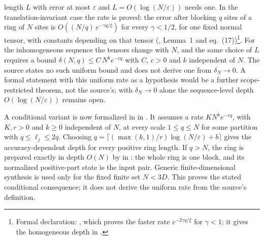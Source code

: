 \documentclass{article}
\begin{document}
\begin{enumerate}
          length $L$ with error at most $\varepsilon$ and $L=O(\log(N/\varepsilon))$
          needs one. In the translation-invariant case the rate is proved: the
          error after blocking $q$ sites of a ring of $N$ sites is
          $O((N/q)\,e^{-\gamma q/\xi})$ for every $\gamma<1/2$, for one fixed
          normal tensor, with constants depending on that tensor (\cite{Malz2024Preparation}, Lemma~1 and
          eq.~(17))\footnote{Formal declaration:
              , which proves
              the faster rate $e^{-2\gamma q/\xi}$ for $\gamma<1$; it gives the
              homogeneous depth in
              .}.
          For the inhomogeneous sequence the tensors change with $N$, and the
          same choice of $L$ requires a bound
          $\delta(N,q)\le C\,N^{k}e^{-cq}$ with $C$, $c>0$ and $k$ independent of
          $N$. The source states no such uniform bound and does not derive one
          from $\delta_N\to0$. A formal statement with this uniform rate as a
          hypothesis would be a further scope-restricted theorem, not the
          source's; with $\delta_N\to0$ alone the sequence-level depth
          $O(\log(N/\varepsilon))$ remains open.

          A conditional variant is now formalized in
          in .
          It assumes a rate $KN^ke^{-rq}$, with $K,r>0$ and $k\ge0$
          independent of $N$, at every scale $1\le q\le N$ for some
          partition with $q\le\ell_j\le2q$.
          Choosing $q=\lceil (\max(k,1)/r)\log(N/\varepsilon)+b\rceil$
          gives the accuracy-dependent depth for every positive ring length.
          If $q>N$, the ring is prepared exactly in depth $O(N)$ by
          in :
          the whole ring is one block, and its normalized positive-part state
          is the input pair. Generic finite-dimensional synthesis is used
          only for the fixed finite set $N<3D$. This proves the stated
          conditional consequence; it does not derive the uniform rate from
          the source's definition.
\end{enumerate}
\end{document}
